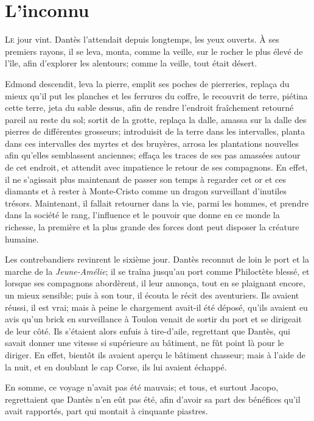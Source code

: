 \chapter{L'inconnu}

\lettrine{L}{e} jour vint. Dantès l'attendait depuis longtemps, les yeux ouverts. À ses premiers rayons, il se leva, monta, comme la veille, sur le rocher le plus élevé de l'île, afin d'explorer les alentours; comme la veille, tout était désert.

Edmond descendit, leva la pierre, emplit ses poches de pierreries, replaça du mieux qu'il put les planches et les ferrures du coffre, le recouvrit de terre, piétina cette terre, jeta du sable dessus, afin de rendre l'endroit fraîchement retourné pareil au reste du sol; sortit de la grotte, replaça la dalle, amassa sur la dalle des pierres de différentes grosseurs; introduisit de la terre dans les intervalles, planta dans ces intervalles des myrtes et des bruyères, arrosa les plantations nouvelles afin qu'elles semblassent anciennes; effaça les traces de ses pas amassées autour de cet endroit, et attendit avec impatience le retour de ses compagnons. En effet, il ne s'agissait plus maintenant de passer son temps à regarder cet or et ces diamants et à rester à Monte-Cristo comme un dragon surveillant d'inutiles trésors. Maintenant, il fallait retourner dans la vie, parmi les hommes, et prendre dans la société le rang, l'influence et le pouvoir que donne en ce monde la richesse, la première et la plus grande des forces dont peut disposer la créature humaine.

Les contrebandiers revinrent le sixième jour. Dantès reconnut de loin le port et la marche de la \textit{Jeune-Amélie}; il se traîna jusqu'au port comme Philoctète blessé, et lorsque ses compagnons abordèrent, il leur annonça, tout en se plaignant encore, un mieux sensible; puis à son tour, il écouta le récit des aventuriers. Ils avaient réussi, il est vrai; mais à peine le chargement avait-il été déposé, qu'ils avaient eu avis qu'un brick en surveillance à Toulon venait de sortir du port et se dirigeait de leur côté. Ils s'étaient alors enfuis à tire-d'aile, regrettant que Dantès, qui savait donner une vitesse si supérieure au bâtiment, ne fût point là pour le diriger. En effet, bientôt ils avaient aperçu le bâtiment chasseur; mais à l'aide de la nuit, et en doublant le cap Corse, ils lui avaient échappé.

En somme, ce voyage n'avait pas été mauvais; et tous, et surtout Jacopo, regrettaient que Dantès n'en eût pas été, afin d'avoir sa part des bénéfices qu'il avait rapportés, part qui montait à cinquante piastres.

